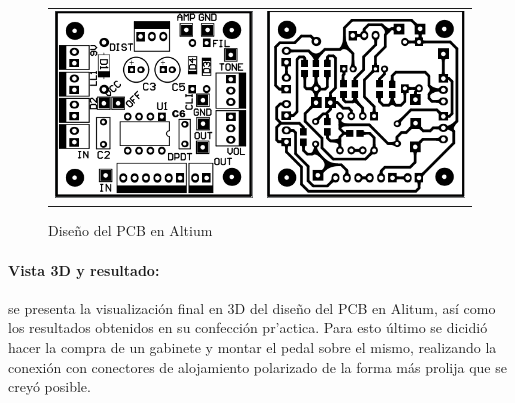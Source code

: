 \begin{figure}[H]
    \centering
    \begin{tabular}{c c}
        \includegraphics[scale=0.7]{../EJ5/Recursos/pcb_top.PNG} &
        \includegraphics[scale=0.7]{../EJ5/Recursos/pcb_bottom.PNG}
    \end{tabular}
    \caption{Dise\~no del PCB en Altium}
    \label{fig:pedal_pcb}
\end{figure}

\paragraph*{Vista 3D y resultado:} se presenta la visualizaci\'on final en 3D del dise\~no del PCB en Alitum, as\'i como los
resultados obtenidos en su confecci\'on pr'actica. Para esto \'ultimo se dicidi\'o hacer la compra de un gabinete y montar el pedal sobre el mismo, realizando la conexi\'on
con conectores de alojamiento polarizado de la forma m\'as prolija que se crey\'o posible. 

